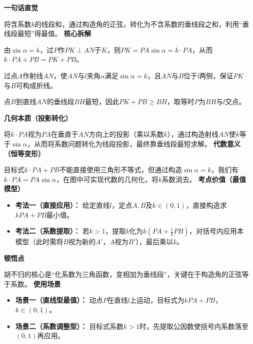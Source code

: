 \begin{explanationbox}
	\textbf{\textcolor{CExplanation}{一句话直觉}}

	将含系数$k$的线段和，通过构造角的正弦，转化为不含系数的垂线段之和，利用“垂线段最短”得最值。
	\medskip
	\textbf{\textcolor{CExplanation}{核心拆解}}
	\begin{description}[style=nextline, leftmargin=2.8em, labelsep=0.5em, itemsep=0.45em]
		\item[\textbf{要点一（系数转化）：}] 由$\sin\alpha=k$，过$P$作$PK\perp AN$于$K$，则$PK=PA\sin\alpha=k\cdot PA$，从而$k\cdot PA+PB=PK+PB$。
		\item[\textbf{要点二（构造定角）：}] 过点$A$作射线$AN$，使$AN$与$l$夹角$\alpha$满足$\sin\alpha=k$，且$AN$与$B$位于$l$两侧，保证$PK$与$B$可构成折线。
		\item[\textbf{要点三（最值原理）：}] 点$B$到直线$AN$的垂线段$BH$最短，因此$PK+PB\ge BH$，取等时$P$为$BH$与$l$交点。
	\end{description}
	\medskip
	\textbf{\textcolor{CExplanation}{几何本质（投影转化）}}

	将$k\cdot PA$视为$PA$在垂直于$AN$方向上的投影（乘以系数$k$），通过构造射线$AN$使$k$等于$\sin\alpha$，从而将系数问题转化为线段投影，最终靠垂线段最短求解。
	\medskip
	\textbf{\textcolor{CExplanation}{代数意义（恒等变形）}}

	目标式$k\cdot PA+PB$不能直接使用三角形不等式，但通过构造$\sin\alpha=k$，我们有$k\cdot PA=PA\sin\alpha$，在图中可实现代数的几何化，将$k$系数消去。
	\medskip
	\textbf{\textcolor{CExplanation}{考点价值（最值模型）}}
	\begin{itemize}[leftmargin=*, itemsep=0.5em, topsep=0.4em]
		\item \textbf{考法一（直接应用）：} 给定直线$l$，定点$A,B$及$k\in(0,1)$，直接构造求$kPA+PB$最小值。
		\item \textbf{考法二（系数提取）：} 若$k>1$，提取$k$化为$k\left(PA+\frac{1}{k}PB\right)$，对括号内应用本模型（此时需将$B$视为新的$A'$，$A$视为$B'$），最后乘以$k$。
	\end{itemize}
	\medskip
	\textbf{\textcolor{CExplanation}{顿悟点}}

	胡不归的核心是“化系数为三角函数，变相加为垂线段”，关键在于构造角的正弦等于系数。
	\medskip
	\textbf{\textcolor{CExplanation}{使用场景}}
	\begin{itemize}[leftmargin=*, itemsep=0.5em, topsep=0.4em]
		\item \textbf{场景一（直线型最值）：} 动点$P$在直线$l$上运动，目标式为$kPA+PB$，$k\in(0,1)$。
		\item \textbf{场景二（系数调整型）：} 目标式系数$k>1$时，先提取公因数使括号内系数落至$(0,1)$再应用。
	\end{itemize}
\end{explanationbox}
